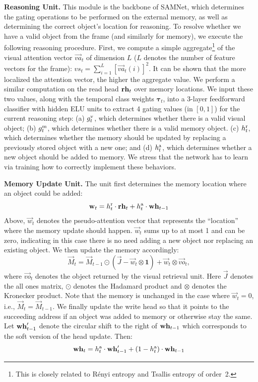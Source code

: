 \noindent\textbf{Reasoning Unit.}
This module is the backbone of SAMNet, which determines the gating operations to be performed on the external memory, as well as determining the correct object's location for reasoning.
To resolve whether we have a valid object from the frame (and similarly for memory), we execute the following reasoning procedure.
First, we compute a simple aggregate\footnote{%
	This is closely related to R\'{e}nyi entropy and Tsallis entropy of order~2.} of the visual attention vector $\vec{va}_t$ of dimension $L$ ($L$ denotes the number of feature vectors for the frame):
$vs_t = \sum_{i=1}^L [\vec{va}_t(i)]^2$. It can be shown that the more localized the attention
vector, the higher the aggregate value.
We perform a similar computation on the read head $\mathbf{rh}_t$ over memory locations.
We input these two values, along with the temporal class weights $\bm{\tau}_t$, into a 3-layer feedforward classifier with hidden ELU units to extract 4 gating values (in $[0,1]$) for the current reasoning step:
(a) $g^{\mathrm{v}}_t$, which determines whether there is a valid visual object;
(b) $g^{\mathrm{m}}_t$, which determines whether there is a valid memory object.
(c) $h^{\mathrm{r}}_t$, which determines whether the memory should be updated by replacing a previously stored object with a new one; and
(d) $h^{\mathrm{a}}_t$, which determines whether a new object should be added to memory.
We stress that the network has to learn via training how to correctly implement these behaviors.

\smallskip

\noindent\textbf{Memory Update Unit.}
The unit first determines the memory location where an object could be added:
\[ \mathbf{w}_t = h^{\mathrm{r}}_t \cdot \mathbf{rh}_t + h^{\mathrm{a}}_t \cdot \mathbf{wh}_{t-1} \]
Above, $\vec{w}_t$ denotes the pseudo-attention vector that represents the ``location'' where the memory update should happen.
$\vec{w}_t$ sums up to at most 1 and can be zero, indicating in this case there is no need adding a new object nor replacing an existing object.
We then update the memory accordingly:
\[ \vec{M}_t = \vec{M}_{t-1} \odot (\vec{J} - \vec{w}_t  \otimes \mathbf{1}) + \vec{w}_t  \otimes \vec{vo}_t,\]
where $\vec{vo}_t$ denotes the object returned by the visual retrieval unit.
Here $\vec{J}$ denotes the all ones matrix, $\odot$ denotes the Hadamard product and $\otimes$ denotes the Kronecker product.
Note that the memory is unchanged in the case where $\vec{w}_t = 0$, i.e., $\vec{M}_t = \vec{M}_{t-1}$.
We finally update the write head so that it points to the succeeding address if an object was added to memory or otherwise stay the same.
Let $\mathbf{wh}'_{t-1}$ denote the circular shift to the right of $\mathbf{wh}_{t-1}$ which corresponds to the soft version of the head update.
Then:
\[ \mathbf{wh}_t = h^{\mathrm{a}}_t \cdot \mathbf{wh}'_{t-1} + (1-h^{\mathrm{a}}_t) \cdot \mathbf{wh}_{t-1} \]


